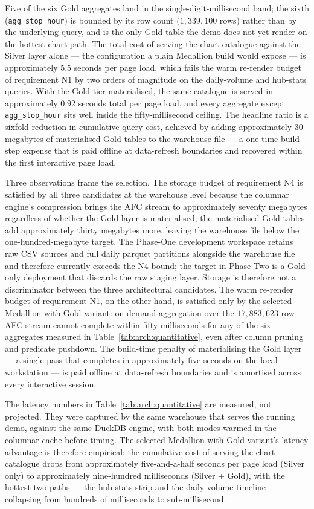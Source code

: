 Five of the six Gold aggregates land in the single-digit-millisecond
band; the sixth (\texttt{agg\_stop\_hour}) is bounded by its row count
(\(1{,}339{,}100\) rows) rather than by the underlying query, and is
the only Gold table the demo does not yet render on the hottest chart
path. The total cost of serving the chart catalogue against the
Silver layer alone --- the configuration a plain Medallion build
would expose --- is approximately \(5.5\) seconds per page load,
which fails the warm re-render budget of requirement N1 by two orders
of magnitude on the daily-volume and hub-stats queries. With the Gold
tier materialised, the same catalogue is served in approximately
\(0.92\) seconds total per page load, and every aggregate except
\texttt{agg\_stop\_hour} sits well inside the fifty-millisecond
ceiling. The headline ratio is a sixfold reduction in cumulative
query cost, achieved by adding approximately \(30\) megabytes of
materialised Gold tables to the warehouse file --- a one-time
build-step expense that is paid offline at data-refresh boundaries
and recovered within the first interactive page load.

Three observations frame the selection. The storage budget of
requirement N4 is satisfied by all three candidates at the warehouse
level because the columnar engine's compression brings the AFC stream
to approximately seventy megabytes regardless of whether the Gold layer
is materialised; the materialised Gold tables add approximately thirty
megabytes more, leaving the warehouse file below the
one-hundred-megabyte target. The Phase-One development workspace
retains raw CSV sources and full daily parquet partitions alongside the
warehouse file and therefore currently exceeds the N4 bound; the target
in Phase Two is a Gold-only deployment that discards the raw staging
layer. Storage is therefore not a discriminator between the three
architectural candidates.
The warm re-render budget of requirement N1, on the other hand, is
satisfied only by the selected Medallion-with-Gold variant: on-demand
aggregation over the \(17{,}883{,}623\)-row AFC stream cannot complete
within fifty milliseconds for any of the six aggregates measured in
Table~\ref{tab:arch:quantitative}, even after column pruning and
predicate pushdown. The build-time penalty of materialising the Gold
layer --- a single pass that completes in approximately five seconds
on the local workstation --- is paid offline at data-refresh
boundaries and is amortised across every interactive session.

The latency numbers in Table~\ref{tab:arch:quantitative} are
measured, not projected. They were captured by the same warehouse
that serves the running demo, against the same DuckDB engine, with
both modes warmed in the columnar cache before timing. The selected
Medallion-with-Gold variant's latency advantage is therefore
empirical: the cumulative cost of serving the chart catalogue drops
from approximately five-and-a-half seconds per page load (Silver
only) to approximately nine-hundred milliseconds (Silver + Gold),
with the hottest two paths --- the hub stats strip and the
daily-volume timeline --- collapsing from hundreds of milliseconds to
sub-millisecond.

